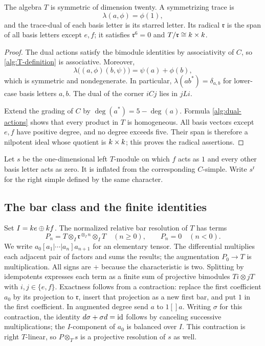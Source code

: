 \begin{lemma}\label{alg:T}
The algebra $T$ is symmetric of dimension twenty.  A symmetrizing
trace is
\[
 \lambda(a,\phi)=\phi(1),
\]
and the trace-dual of each basis letter is its starred letter.  Its
radical $\mathfrak r$ is the span of all basis letters except $e,f$;
it satisfies $\mathfrak r^6=0$ and $T/\mathfrak r\cong k\times k$.
\end{lemma}

\begin{proof}
The dual actions satisfy the bimodule identities by associativity of
$C$, so \eqref{alg:T-definition} is associative.  Moreover,
\[
 \lambda\bigl((a,\phi)(b,\psi)\bigr)=\psi(a)+\phi(b),
\]
which is symmetric and nondegenerate.  In particular,
$\lambda(ab^*)=\delta_{a,b}$ for lower-case basis letters $a,b$.
The dual of the corner $iCj$ lies in $jLi$.

Extend the grading of $C$ by
$\deg(a^*)=5-\deg(a)$.  Formula \eqref{alg:dual-actions} shows that
every product in $T$ is homogeneous.  All basis vectors except $e,f$
have positive degree, and no degree exceeds five.  Their span is
therefore a nilpotent ideal whose quotient is $k\times k$;
this proves the radical assertions.
\end{proof}

Let $s$ be the one-dimensional left $T$-module on which $f$ acts as
$1$ and every other basis letter acts as zero.  It is inflated from
the corresponding $C$-simple.  Write $s^{\mathrm r}$ for the right
simple defined by the same character.

\subsection{The bar class and the finite identities}

Set $I=k e\oplus k f$.  The normalized relative bar resolution of
$T$ has terms
\begin{equation}
 P_n=T\otimes_I\mathfrak r^{\otimes_I n}\otimes_I T
 \quad(n\ge0),\qquad P_n=0\quad(n<0).
\label{alg:bar}
\end{equation}
We write $a_0[a_1|\cdots|a_n]a_{n+1}$ for an elementary tensor.  The
differential multiplies each adjacent pair of factors and sums the
results; the augmentation $P_0\to T$ is multiplication.  All signs
are $+$ because the characteristic is two.  Splitting by idempotents
expresses each term as a finite sum of projective bimodules
$Ti\otimes jT$ with $i,j\in\{e,f\}$.  Exactness follows from a contraction:
replace the first coefficient $a_0$ by its projection to
$\mathfrak r$, insert that projection as a new first bar, and put
$1$ in the first coefficient.  In augmented degree send $a$ to
$1[]a$.  Writing $\sigma$ for this contraction, the identity
$d\sigma+\sigma d=\operatorname{id}$ follows by canceling successive
multiplications; the $I$-component of $a_0$ is balanced over $I$.
This contraction is right $T$-linear, so $P\otimes_T s$ is a
projective resolution of $s$ as well.

